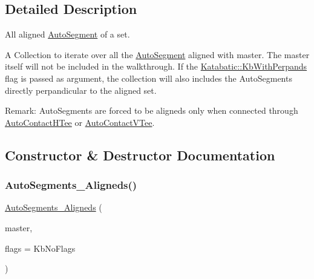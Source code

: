 \subsection{Detailed Description}
All aligned \hyperlink{classKatabatic_1_1AutoSegment}{Auto\+Segment} of a set. 

A Collection to iterate over all the \hyperlink{classKatabatic_1_1AutoSegment}{Auto\+Segment} aligned with {\ttfamily master}. The {\ttfamily master} itself will not be included in the walkthrough. If the \hyperlink{namespaceKatabatic_a2af2ad6b6441614038caf59d04b3b217ae2d033c8f78b61468c827de8db5fe839}{Katabatic\+::\+Kb\+With\+Perpands} flag is passed as argument, the collection will also includes the Auto\+Segments directly perpandicular to the aligned set.

\begin{DoxyParagraph}{Remark\+:}
Auto\+Segments are forced to be aligneds only when connected through \hyperlink{classKatabatic_1_1AutoContactHTee}{Auto\+Contact\+H\+Tee} or \hyperlink{classKatabatic_1_1AutoContactVTee}{Auto\+Contact\+V\+Tee}. 
\end{DoxyParagraph}


\subsection{Constructor \& Destructor Documentation}
\mbox{\label{classKatabatic_1_1AutoSegments__Aligneds_a97d48d49a2372cf289d321e6abf81c2d}} 
\subsubsection{\texorpdfstring{Auto\+Segments\+\_\+\+Aligneds()}{AutoSegments\_Aligneds()}\hspace{0.1cm}{\footnotesize\ttfamily [1/2]}}
{\footnotesize\ttfamily \hyperlink{classKatabatic_1_1AutoSegments__Aligneds}{Auto\+Segments\+\_\+\+Aligneds} (\begin{DoxyParamCaption}\item[{\hyperlink{classKatabatic_1_1AutoSegment}{Auto\+Segment} $\ast$}]{master,  }\item[{unsigned int}]{flags = {\ttfamily KbNoFlags} }\end{DoxyParamCaption})\hspace{0.3cm}{\ttfamily [inline]}}

